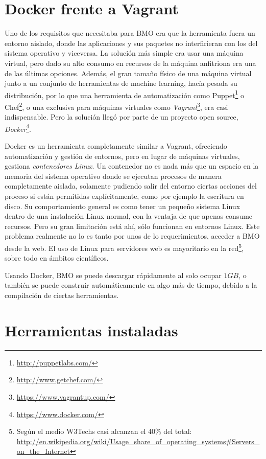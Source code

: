 \section{Docker frente a Vagrant} \label{sec:4.3}

Uno de los requisitos que necesitaba para BMO era que la herramienta fuera un entorno aislado, donde las aplicaciones y sus paquetes no interfirieran con los del sistema operativo y viceversa. La solución más simple era usar una máquina virtual, pero dado su alto consumo en recursos de la máquina anfitriona era una de las últimas opciones. Además, el gran tamaño físico de una máquina virtual junto a un conjunto de herramientas de machine learning, hacía pesada su distribución, por lo que una herramienta de automatización como Puppet\footnote{\url{http://puppetlabs.com/}} o Chef\footnote{\url{http://www.getchef.com/}}, o una exclusiva para máquinas virtuales como \emph{Vagrant}\footnote{\url{https://www.vagrantup.com/}}, era casi indispensable. Pero la solución llegó por parte de un proyecto open source, \emph{Docker}\footnote{\url{https://www.docker.com/}}.

Docker es un herramienta completamente similar a Vagrant, ofreciendo automatización y gestión de entornos, pero en lugar de máquinas virtuales, gestiona \emph{contenedores Linux}. Un contenedor no es nada más que un espacio en la memoria del sistema operativo donde se ejecutan procesos de manera completamente aislada, solamente pudiendo salir del entorno ciertas acciones del proceso si están permitidas explícitamente, como por ejemplo la escritura en disco. Su comportamiento general es como tener un pequeño sistema Linux dentro de una instalación Linux normal, con la ventaja de que apenas consume recursos. Pero su gran limitación está ahí, sólo funcionan en entornos Linux. Este problema realmente no lo es tanto por unos de lo requerimientos, acceder a BMO desde la web. El uso de Linux para servidores web es mayoritario en la red\footnote{Según el medio W3Techs casi alcanzan el 40\% del total: \url{http://en.wikipedia.org/wiki/Usage_share_of_operating_systems\#Servers_on_the_Internet}}, sobre todo en ámbitos científicos.

Usando Docker, BMO se puede descargar rápidamente al solo ocupar $1GB$, o también se puede construir automáticamente en algo más de tiempo, debido a la compilación de ciertas herramientas.

\section{Herramientas instaladas} \label{sec:4.4}

